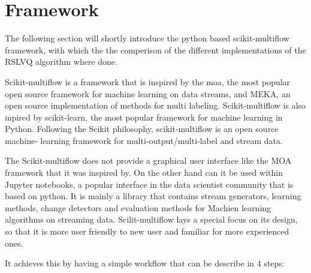 \documentclass[12pt,oneside,a4paper,parskip]{scrbook}
\begin{document}
\section{Framework}

The following section will shortly introduce the python based scikit-multiflow framework, with which the the comperison 
of the different implementations of the RSLVQ algorithm where done.

Scikit-multiflow is a framework that is inspired by the \ac{moa}, the most popular open source framework for machine learning on data streams,
and MEKA, an open source implementation of methods for multi labeling. Scikit-multiflow is also inpired by scikit-learn, the most 
popular framework for machine learning in Python. Following the Scikit philosophy, scikit-multiflow is an open source machine-
learning framework for multi-output/multi-label and stream data. 

The Scikit-multiflow does not provide a graphical user interface like the MOA framework that it was inspired by. 
On the other hand can it be used within Jupyter notebooks, a popular interface in the data scientist community that is based 
on python. 
It is mainly a library that contains stream generators, learning methods, change detectors and evaluation methods for 
Machien learning algorithms on streaming data. 
Scilit-multiflow lays a special focus on its design, so that it is more user friendly to new user and familiar for more 
experienced ones.\cite{skmultiflow}

It achieves this by having a simple workflow that can be describe in 4 steps:
\end{document}
